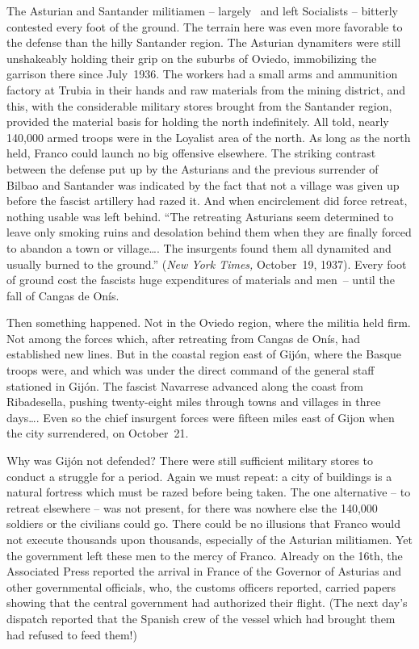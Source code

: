 The Asturian and Santander militiamen – largely \CNT\ and left Socialists – bitterly contested every foot of the ground. The terrain here was even more favorable to the defense than the hilly Santander region. The Asturian dynamiters were still unshakeably holding their grip on the suburbs of Oviedo, immobilizing the garrison there since July~1936. The workers had a small arms and ammunition factory at Trubia in their hands and raw materials from the mining district, and this, with the considerable military stores brought from the Santander region, provided the material basis for holding the north indefinitely. All told, nearly \textsc{140\kn,000} armed troops were in the Loyalist area of the north. As long as the north held, Franco could launch no big offensive elsewhere. The striking contrast between the defense put up by the Asturians and the previous surrender of Bilbao and Santander was indicated by the fact that not a village was given up before the fascist artillery had razed it. And when encirclement did force retreat, nothing usable was left behind. ``\kp The retreating Asturians seem determined to leave only smoking ruins and desolation behind them when they are finally forced to abandon a town or village\dots. The insurgents found them all dynamited and usually burned to the ground.\kn\kn'' (\emph{New York Times,} October~19, 1937). Every foot of ground cost the fascists huge expenditures of materials and men~-- until the fall of Cangas de On\'is.

Then something happened. Not in the Oviedo region, where the militia held firm. Not among the forces which, after retreating from Cangas de On\'is, had established new lines. But in the coastal region east of Gij\'on, where the Basque troops were, and which was under the direct command of the general staff stationed in Gij\'on. The fascist Navarrese advanced along the coast from Ribadesella, pushing twenty-eight miles through towns and villages in three days\dots. Even so the chief insurgent forces were fifteen miles east of Gijon when the city surrendered, on October~21.

Why was Gij\'on not defended? There were still sufficient military stores to conduct a struggle for a period. Again we must repeat: a city of buildings is a natural fortress which must be razed before being taken. The one alternative – to retreat elsewhere – was not present, for there was nowhere else the \textsc{140\kn,000} soldiers or the civilians could go. There could be no illusions that Franco would not execute thousands upon thousands, especially of the Asturian militiamen. Yet the government left these men to the mercy of Franco. Already on the 16th, the Associated Press reported the arrival in France of the Governor of Asturias and other governmental officials, who, the customs officers reported, carried papers showing that the central government had authorized their flight. (The next day’s dispatch reported that the Spanish crew of the vessel which had brought them had refused to feed them!)

